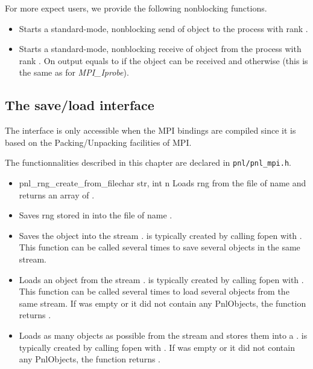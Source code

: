 For more expect users, we provide the following nonblocking functions.
\begin{itemize}
\item {}
  \sshortdescribe Starts a standard-mode, nonblocking send of object
   to the process with rank .
  
  
\item {}
  \sshortdescribe Starts a standard-mode, nonblocking receive of object
   from the process with rank . On output  equals
  to  if the object can be received and  otherwise (this
  is the same as for {\it MPI_Iprobe}).
\end{itemize}

\subsection{The save/load interface}

The interface is only accessible when the MPI bindings are compiled since it
is based on the Packing/Unpacking facilities of MPI.

The functionnalities described in this chapter are declared in \verb!pnl/pnl_mpi.h!.
\begin{itemize}
\item {}
  {pnl_rng_create_from_file}{char \ptr str, int n}
  \sshortdescribe Loads  rng from the file of name  and
  returns an array of  .
\item {}
    \sshortdescribe Saves  rng stored in  into the file of
  name .
\item {}
  \sshortdescribe Saves the object  into the stream . 
  is typically created by calling fopen with . This function can be
  called several times to save several objects in the same stream.
\item {}
  \sshortdescribe Loads an object from the stream . 
  is typically created by calling fopen with .  This function can be
  called several times to load several objects from the same stream. If 
  was empty or it did not contain any PnlObjects, the function returns .
\item {}
  \sshortdescribe Loads as many objects as possible from the stream  and
  stores them into a .  is typically created by
  calling fopen with . If  was empty or it did not contain
  any PnlObjects, the function returns .
\end{itemize}


